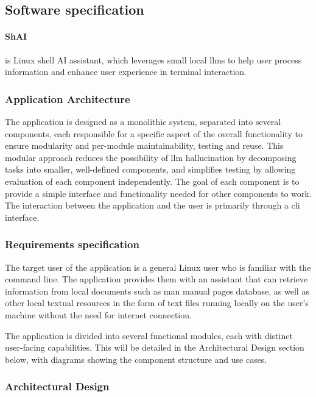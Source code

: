 
\subsection{Software specification}

\paragraph{ShAI} is Linux shell AI assistant, which leverages small local \glspl{llm} to
help user process information and enhance user experience in terminal interaction.

\subsubsection{Application Architecture}

The application is designed as a monolithic system, separated into several components,
each responsible for a specific aspect of the overall functionality to ensure modularity
and per-module maintainability, testing and reuse. This modular approach reduces the
possibility of \gls{llm} hallucination by decomposing tasks into smaller, well-defined
components, and simplifies testing by allowing evaluation of each component independently.
The goal of each component is to provide a simple interface and functionality needed for
other components to work. The interaction between the application and the user is
primarily through a \gls{cli} interface.

\subsubsection{Requirements specification}

The target user of the application is a general Linux user who is familiar with
the command line. The application provides them with an assistant that can retrieve
information from local documents such as man manual pages database, as well as
other local textual resources in the form of text files running locally on the
user's machine without the need for internet connection.

The application is divided into several functional modules, each with distinct
user-facing capabilities. This will be detailed in the Architectural Design section below, with
diagrams showing the component structure and use cases.


\subsubsection{Architectural Design}


